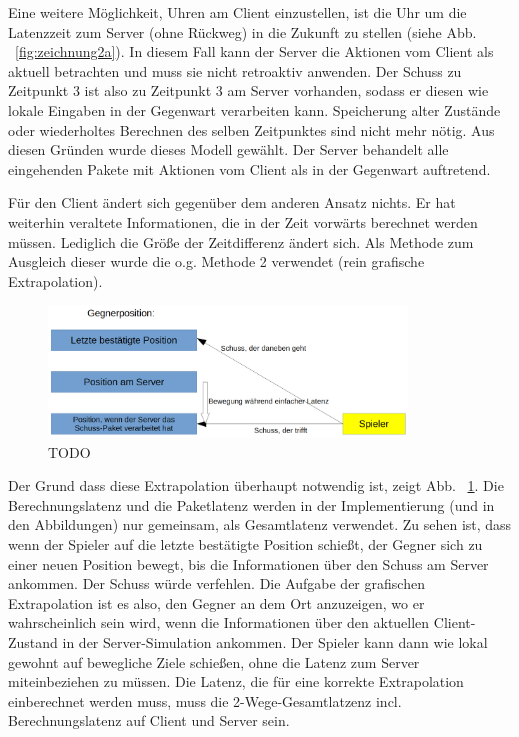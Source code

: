 Eine weitere Möglichkeit, Uhren am Client einzustellen, ist die Uhr um die Latenzzeit zum Server (ohne Rückweg) in die Zukunft zu stellen (siehe Abb. ~\ref{fig:zeichnung2a}). In diesem Fall kann der Server die Aktionen vom Client als aktuell betrachten und muss sie nicht retroaktiv anwenden. Der Schuss zu Zeitpunkt 3 ist also zu Zeitpunkt 3 am Server vorhanden, sodass er diesen wie lokale Eingaben in der Gegenwart verarbeiten kann. Speicherung alter Zustände oder wiederholtes Berechnen des selben Zeitpunktes sind nicht mehr nötig. Aus diesen Gründen wurde dieses Modell gewählt. Der Server behandelt alle eingehenden Pakete mit Aktionen vom Client als in der Gegenwart auftretend.

Für den Client ändert sich gegenüber dem anderen Ansatz nichts. Er hat weiterhin veraltete Informationen, die in der Zeit vorwärts berechnet werden müssen. Lediglich die Größe der Zeitdifferenz ändert sich. Als Methode zum Ausgleich dieser wurde die o.g. Methode 2 verwendet (rein grafische Extrapolation).
\begin{figure}
    \centering
    \includegraphics[width=0.85\textwidth]{./Gegnerposition1a.png}
    \caption{TODO}
    \label{fig:gegnerposition1a}
\end{figure}
Der Grund dass diese Extrapolation überhaupt notwendig ist, zeigt Abb. ~\ref{fig:gegnerposition1a}. Die Berechnungslatenz und die Paketlatenz werden in der Implementierung (und in den Abbildungen) nur gemeinsam, als Gesamtlatenz verwendet. Zu sehen ist, dass wenn der Spieler auf die letzte bestätigte Position schießt, der Gegner sich zu einer neuen Position bewegt, bis die Informationen über den Schuss am Server ankommen. Der Schuss würde verfehlen. Die Aufgabe der grafischen Extrapolation ist es also, den Gegner an dem Ort anzuzeigen, wo er wahrscheinlich sein wird, wenn die Informationen über den aktuellen Client-Zustand in der Server-Simulation ankommen. Der Spieler kann dann wie lokal gewohnt auf bewegliche Ziele schießen, ohne die Latenz zum Server miteinbeziehen zu müssen.
Die Latenz, die für eine korrekte Extrapolation einberechnet werden muss, muss die 2-Wege-Gesamtlatzenz incl. Berechnungslatenz auf Client und Server sein.


